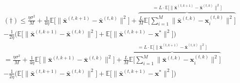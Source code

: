 \begin{align*}
    (\dagger) \leq \frac{\eta \sigma^2}{M} +  \frac{1}{4\eta} \mathbb{E} \Bigg[  \| \bar{\bm{x}}^{(t,k+1)} - \bar{\bm{x}}^{(t,k)} \|^2 \Bigg]
    + \overbrace{\frac{L}{M}  \mathbb{E} \Bigg[ \sum_{i=1}^M \|\bar{\bm{x}}^{(t,k)}-\bm{x}_i^{(t,k)} \|^2 \Bigg]}^{=L\cdot \mathbb{E} \Bigg[  \| \bar{\bm{x}}^{(t,k+1)} - \bar{\bm{x}}^{(t,k)} \|^2 \Bigg]} \\
    -  \frac{1}{2\eta} \Bigg( \mathbb{E} \Big[  \|  \bar{\bm{x}}^{(t,k+1)} - \bar{\bm{x}}^{(t,k)} \|^2 \Big] 
    + \mathbb{E} \Big[  \| \bar{\bm{x}}^{(t,k+1)} - \bm{x}^{*} \|^2  \Big] \Bigg)\\
    = \frac{\eta \sigma^2}{M} +  \frac{1}{4\eta} \mathbb{E} \Bigg[  \| \bar{\bm{x}}^{(t,k+1)} - \bar{\bm{x}}^{(t,k)} \|^2 \Bigg]
    + \overbrace{\frac{L}{M}  \mathbb{E} \Bigg[ \sum_{i=1}^M \|\bar{\bm{x}}^{(t,k)}-\bm{x}_i^{(t,k)} \|^2 \Bigg]}^{=L\cdot \mathbb{E} \Bigg[  \| \bar{\bm{x}}^{(t,k+1)} - \bar{\bm{x}}^{(t,k)} \|^2 \Bigg]} \\
    -  \frac{1}{2\eta} \Bigg( \mathbb{E} \Big[  \|  \bar{\bm{x}}^{(t,k+1)} - \bar{\bm{x}}^{(t,k)} \|^2 \Big] 
    + \mathbb{E} \Big[  \| \bar{\bm{x}}^{(t,k+1)} - \bm{x}^{*} \|^2  \Big] \Bigg)
\end{align*}
